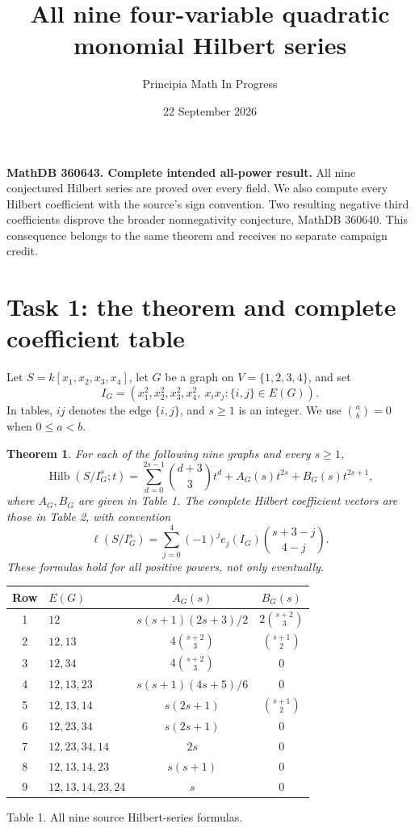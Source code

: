 \documentclass[11pt]{article}
\title{All nine four-variable quadratic monomial Hilbert series}
\author{Principia Math In Progress}
\date{22 September 2026}
\newtheorem{theorem}{Theorem}
\newcommand{\bin}[2]{\binom{#1}{#2}}
\begin{document}
\maketitle
\noindent\textbf{MathDB 360643. Complete intended all-power result.}
All nine conjectured Hilbert series are proved over every field.
We also compute every Hilbert coefficient with the source's sign
convention. Two resulting negative third coefficients disprove the
broader nonnegativity conjecture, MathDB 360640. This consequence
belongs to the same theorem and receives no separate campaign credit.

\section*{Task 1: the theorem and complete coefficient table}
Let \(S=k[x_1,x_2,x_3,x_4]\), let \(G\) be a graph on
\(V=\{1,2,3,4\}\), and set
\[
 I_G=(x_1^2,x_2^2,x_3^2,x_4^2,\ x_ix_j:\{i,j\}\in E(G)).
\]
In tables, \(ij\) denotes the edge \(\{i,j\}\), and \(s\geq1\)
is an integer. We use \(\bin ab=0\) when \(0\leq a<b\).

\begin{theorem}
For each of the following nine graphs and every \(s\geq1\),
\[
 \operatorname{Hilb}(S/I_G^s;t)
 =\sum_{d=0}^{2s-1}\bin{d+3}{3}t^d
             +A_G(s)t^{2s}+B_G(s)t^{2s+1},                  \tag{1}
\]
where \(A_G,B_G\) are given in Table 1. The complete Hilbert
coefficient vectors are those in Table 2, with convention
\[
 \ell(S/I_G^s)=\sum_{j=0}^4(-1)^je_j(I_G)
                             \bin{s+3-j}{4-j}.             \tag{2}
\]
These formulas hold for all positive powers, not only eventually.
\end{theorem}

\begin{center}
\renewcommand{\arraystretch}{1.18}
\begin{tabular}{c l c c}
\toprule
Row&\(E(G)\)&\(A_G(s)\)&\(B_G(s)\)\\\midrule
1&\(12\)&\(s(s+1)(2s+3)/2\)&\(2\bin{s+2}{3}\)\\
2&\(12,13\)&\(4\bin{s+2}{3}\)&\(\bin{s+1}{2}\)\\
3&\(12,34\)&\(4\bin{s+2}{3}\)&0\\
4&\(12,13,23\)&\(s(s+1)(4s+5)/6\)&0\\
5&\(12,13,14\)&\(s(2s+1)\)&\(\bin{s+1}{2}\)\\
6&\(12,23,34\)&\(s(2s+1)\)&0\\
7&\(12,23,34,14\)&\(2s\)&0\\
8&\(12,13,14,23\)&\(s(s+1)\)&0\\
9&\(12,13,14,23,24\)&\(s\)&0\\\bottomrule
\end{tabular}
\par\smallskip Table 1. All nine source Hilbert-series formulas.
\end{center}
\end{document}
